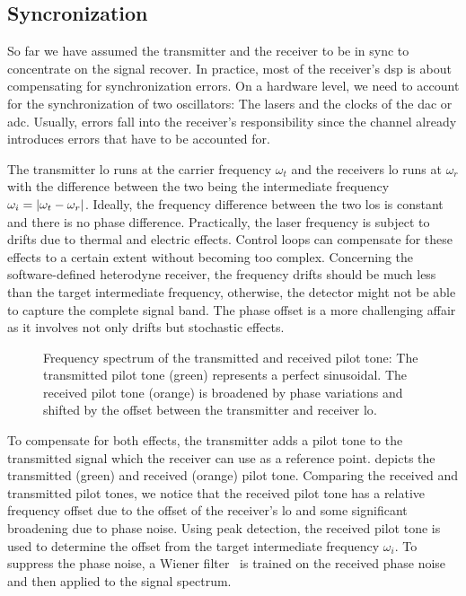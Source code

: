 \FloatBarrier
\subsection{Syncronization}

\cite[p.~359]{Proakis2007} %
\cite{Godard1978} %
\cite{Huang2015,Qi2015,Soh2015} %

So far we have assumed the transmitter and the receiver to be in sync to concentrate on the signal recover.
In practice, most of the receiver's \gls{dsp} is about compensating for synchronization errors.
On a hardware level, we need to account for the synchronization of two oscillators:
The lasers and the clocks of the \gls{dac} or \gls{adc}.
Usually, errors fall into the receiver's responsibility since the channel already introduces errors that have to be accounted for.

The transmitter \gls{lo} runs at the carrier frequency $\omega_t$ and the receivers \gls{lo} runs at $\omega_r$ with the difference between the two being the intermediate frequency $\omega_i=\lvert\omega_t-\omega_r\rvert$.
Ideally, the frequency difference between the two \gls{lo}s is constant and there is no phase difference.
Practically, the laser frequency is subject to drifts due to thermal and electric effects.
Control loops can compensate for these effects to a certain extent without becoming too complex.
Concerning the software-defined heterodyne receiver, the frequency drifts should be much less than the target intermediate frequency, otherwise, the detector might not be able to capture the complete signal band.
The phase offset is a more challenging affair as it involves not only drifts but stochastic effects.
\begin{figure}[htb]
	\centering
	
	\caption{Frequency spectrum of the transmitted and received pilot tone: The transmitted pilot tone (green) represents a perfect sinusoidal. The received pilot tone (orange) is broadened by phase variations and shifted by the offset between the transmitter and receiver \gls{lo}.}\label{fig:pilot_tones}
\end{figure}
To compensate for both effects, the transmitter adds a pilot tone to the transmitted signal which the receiver can use as a reference point.
 depicts the transmitted (green) and received (orange) pilot tone.
Comparing the received and transmitted pilot tones, we notice that the received pilot tone has a relative frequency offset due to the offset of the receiver's \gls{lo} and some significant broadening due to phase noise.
Using peak detection, the received pilot tone is used to determine the offset from the target intermediate frequency $\omega_i$.
To suppress the phase noise, a Wiener filter~\cite{Chen2006} is trained on the received phase noise and then applied to the signal spectrum.


